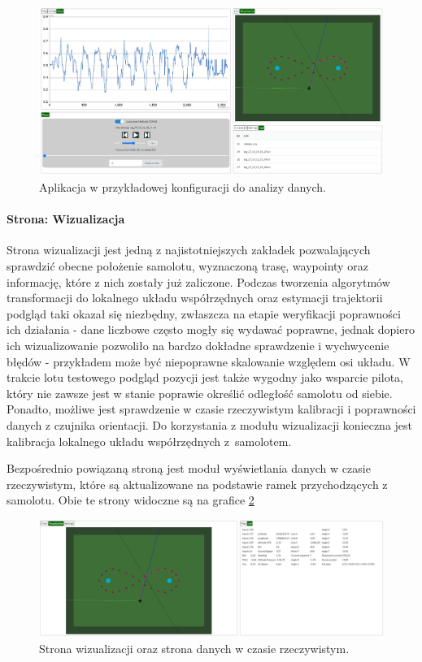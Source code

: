 \documentclass[12pt, a4paper]{article}
\begin{document}
 \begin{figure}[ht]
    \centering
    \includegraphics[width=1\textwidth]{polocie}
    \caption{Aplikacja w przykładowej konfiguracji do analizy danych.}
    \label{fig:web3}
\end{figure}

\FloatBarrier
 
\paragraph{Strona: Wizualizacja}\mbox{}

Strona wizualizacji jest jedną z najistotniejszych zakładek pozwalających sprawdzić obecne położenie samolotu, wyznaczoną trasę, waypointy oraz informację, które z nich zostały już zaliczone. Podczas tworzenia algorytmów transformacji do lokalnego układu współrzędnych oraz estymacji trajektorii podgląd taki okazał się niezbędny, zwłaszcza na etapie weryfikacji poprawności ich działania - dane liczbowe często mogły się wydawać poprawne, jednak dopiero ich wizualizowanie pozwoliło na bardzo dokładne sprawdzenie i wychwycenie błędów - przykładem może być niepoprawne skalowanie względem osi układu. W trakcie lotu testowego podgląd pozycji jest także wygodny jako wsparcie pilota, który nie zawsze jest w stanie poprawie określić odległość samolotu od siebie. Ponadto, możliwe jest sprawdzenie w czasie rzeczywistym kalibracji i poprawności danych z czujnika orientacji. Do korzystania z modułu wizualizacji konieczna jest kalibracja lokalnego układu współrzędnych z~samolotem. 

Bezpośrednio powiązaną stroną jest moduł wyświetlania danych w czasie rzeczywistym, które są aktualizowane na podstawie ramek przychodzących z samolotu. Obie te strony widoczne są na grafice \ref{fig:wizlive}

 \begin{figure}[H]
    \centering
    \includegraphics[width=1\textwidth]{wizualizacja}
    \caption{Strona wizualizacji oraz strona danych w czasie rzeczywistym.}
    \label{fig:wizlive}
\end{figure}
\end{document}
